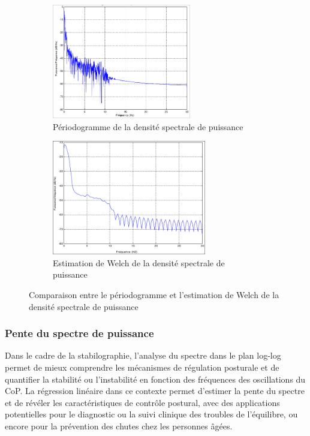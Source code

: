\begin{figure}[ht]
    \centering
    \begin{subfigure}[b]{0.45\textwidth}
        \centering
        \includegraphics[height=5cm]{images/methode/periodogramme.png}
        \caption{Périodogramme de la densité spectrale de puissance}\label{fig:periodogramme}
    \end{subfigure}
    \begin{subfigure}[b]{0.45\textwidth}
        \centering
        \includegraphics[height=5cm]{images/methode/welch.png}
        \caption{Estimation de Welch de la densité spectrale de puissance}\label{fig:welch}
    \end{subfigure}
    \caption{Comparaison entre le périodogramme et l'estimation de Welch de la densité spectrale de puissance}\label{fig:periodogramme_welch}
\end{figure}


\subsubsection{Pente du spectre de puissance}


Dans le cadre de la stabilographie, l'analyse du spectre dans le 
plan log-log permet de mieux comprendre les mécanismes de régulation
posturale et de quantifier la stabilité ou l'instabilité en 
fonction des fréquences des oscillations du CoP. La régression 
linéaire dans ce contexte permet d'estimer la pente du spectre et 
de révéler les caractéristiques de contrôle postural, avec des 
applications potentielles pour le diagnostic ou la suivi clinique
des troubles de l'équilibre, ou encore pour la prévention des 
chutes chez les personnes âgées.\\


